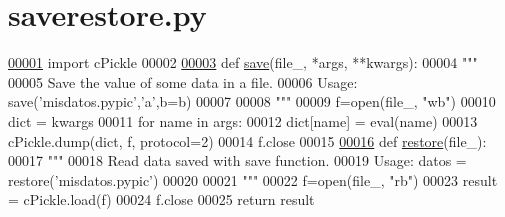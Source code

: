 \hypertarget{saverestore_8py_source}{}\section{saverestore.\+py}
\label{saverestore_8py_source}

\begin{DoxyCode}
\hypertarget{saverestore_8py_source_l00001}{}\hyperlink{namespacepyneb_1_1utils_1_1saverestore}{00001} \textcolor{keyword}{import} cPickle
00002 
\hypertarget{saverestore_8py_source_l00003}{}\hyperlink{namespacepyneb_1_1utils_1_1saverestore_a9af489d3adae16abe18013129170baeb}{00003} \textcolor{keyword}{def }\hyperlink{namespacepyneb_1_1utils_1_1saverestore_a9af489d3adae16abe18013129170baeb}{save}(file\_, *args, **kwargs):
00004     \textcolor{stringliteral}{"""}
00005 \textcolor{stringliteral}{    Save the value of some data in a file.}
00006 \textcolor{stringliteral}{    Usage: save('misdatos.pypic','a',b=b)}
00007 \textcolor{stringliteral}{}
00008 \textcolor{stringliteral}{    """}
00009     f=open(file\_, \textcolor{stringliteral}{"wb"})
00010     dict = kwargs
00011     \textcolor{keywordflow}{for} name \textcolor{keywordflow}{in} args:
00012         dict[name] = eval(name)
00013     cPickle.dump(dict, f, protocol=2)
00014     f.close
00015 
\hypertarget{saverestore_8py_source_l00016}{}\hyperlink{namespacepyneb_1_1utils_1_1saverestore_a0e34f7283fd65ca1d7905f55d3ed5ed7}{00016} \textcolor{keyword}{def }\hyperlink{namespacepyneb_1_1utils_1_1saverestore_a0e34f7283fd65ca1d7905f55d3ed5ed7}{restore}(file\_):
00017     \textcolor{stringliteral}{"""}
00018 \textcolor{stringliteral}{    Read data saved with save function.}
00019 \textcolor{stringliteral}{    Usage: datos = restore('misdatos.pypic')}
00020 \textcolor{stringliteral}{}
00021 \textcolor{stringliteral}{    """}
00022     f=open(file\_, \textcolor{stringliteral}{"rb"})
00023     result = cPickle.load(f)
00024     f.close
00025     \textcolor{keywordflow}{return} result
\end{DoxyCode}
